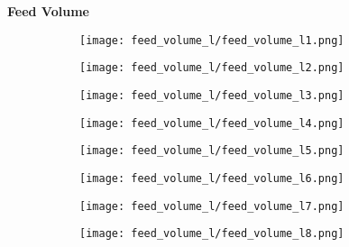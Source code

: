 \documentclass{article}
\begin{document}
    \textbf{Feed Volume}
    \begin{figure}[H]
        \centering
        \begin{subfigure}{0.48\linewidth}
		    \texttt{[image: feed\_volume\_l/feed\_volume\_l1.png]}
	    \end{subfigure}
	    \begin{subfigure}{0.48\linewidth}
		    \texttt{[image: feed\_volume\_l/feed\_volume\_l2.png]}
	    \end{subfigure}
	    \begin{subfigure}{0.48\linewidth}
		    \texttt{[image: feed\_volume\_l/feed\_volume\_l3.png]}
	    \end{subfigure}
	    \begin{subfigure}{0.48\linewidth}
		    \texttt{[image: feed\_volume\_l/feed\_volume\_l4.png]}
	    \end{subfigure}
	    \begin{subfigure}{0.48\linewidth}
		    \texttt{[image: feed\_volume\_l/feed\_volume\_l5.png]}
	    \end{subfigure}
	    \begin{subfigure}{0.48\linewidth}
		    \texttt{[image: feed\_volume\_l/feed\_volume\_l6.png]}
	    \end{subfigure}
	    \begin{subfigure}{0.48\linewidth}
		    \texttt{[image: feed\_volume\_l/feed\_volume\_l7.png]}
	    \end{subfigure}
	    \begin{subfigure}{0.48\linewidth}
		    \texttt{[image: feed\_volume\_l/feed\_volume\_l8.png]}
	    \end{subfigure}
    \end{figure}
    
    \pagebreak
    
\end{document}

